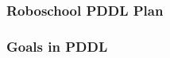 \documentclass{beamer}
\begin{document}
	\begin{frame}[c]\frametitle{Roboschool PDDL Plan}
		
	\end{frame}
	
	\begin{frame}[c]\frametitle{Goals in PDDL}
		\begin{columns}
			\begin{column}[t]{0.3\textwidth}
			
			 			
			\end{column}
			\begin{column}[t]{0.3\textwidth}
			
			 			
			\end{column}
			\begin{column}[t]{0.3\textwidth}
			
			 			
			\end{column}
		\end{columns}
% 			
% 			 			
% 			
% 			 			
% 			
% 			 			
	\end{frame}
	
\end{document}
